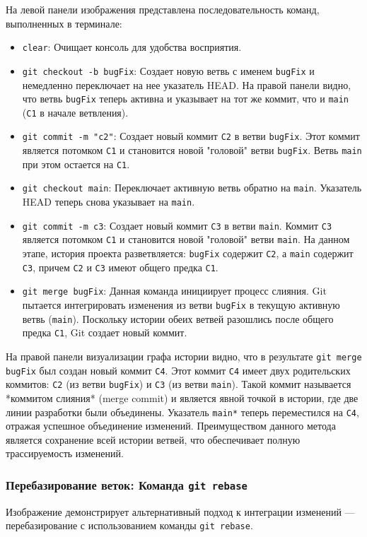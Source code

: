 На левой панели изображения представлена последовательность команд, выполненных в терминале:
\begin{itemize}
    \item \texttt{clear}: Очищает консоль для удобства восприятия.
    \item \texttt{git checkout -b bugFix}: Создает новую ветвь с именем \texttt{bugFix} и немедленно переключает на нее указатель HEAD. На правой панели видно, что ветвь \texttt{bugFix} теперь активна и указывает на тот же коммит, что и \texttt{main} (\texttt{C1} в начале ветвления).
    \item \texttt{git commit -m "c2"}: Создает новый коммит \texttt{C2} в ветви \texttt{bugFix}.
    Этот коммит является потомком \texttt{C1} и становится новой "головой" ветви \texttt{bugFix}.
    Ветвь \texttt{main} при этом остается на \texttt{C1}.
    \item \texttt{git checkout main}: Переключает активную ветвь обратно на \texttt{main}.
    Указатель HEAD теперь снова указывает на \texttt{main}.
    \item \texttt{git commit -m c3}: Создает новый коммит \texttt{C3} в ветви \texttt{main}.
    Коммит \texttt{C3} является потомком \texttt{C1} и становится новой "головой" ветви \texttt{main}.
    На данном этапе, история проекта разветвляется: \texttt{bugFix} содержит \texttt{C2}, а \texttt{main} содержит \texttt{C3}, причем \texttt{C2} и \texttt{C3} имеют общего предка \texttt{C1}.
    \item \texttt{git merge bugFix}: Данная команда инициирует процесс слияния.
    Git пытается интегрировать изменения из ветви \texttt{bugFix} в текущую активную ветвь (\texttt{main}). Поскольку истории обеих ветвей разошлись после общего предка \texttt{C1}, Git создает новый коммит.
\end{itemize}
На правой панели визуализации графа истории видно, что в результате \texttt{git merge bugFix} был создан новый коммит \texttt{C4}.
Этот коммит \texttt{C4} имеет двух родительских коммитов: \texttt{C2} (из ветви \texttt{bugFix}) и \texttt{C3} (из ветви \texttt{main}).
Такой коммит называется *коммитом слияния* (merge commit) и является явной точкой в истории, где две линии разработки были объединены.
Указатель \texttt{main*} теперь переместился на \texttt{C4}, отражая успешное объединение изменений.
Преимуществом данного метода является сохранение всей истории ветвей, что обеспечивает полную трассируемость изменений.

\subsubsection{Перебазирование веток: Команда \texttt{git rebase}}\label{subsubsec:git-rebase}
Изображение  демонстрирует альтернативный подход к интеграции изменений — перебазирование с использованием команды \texttt{git rebase}.

